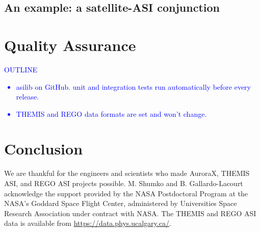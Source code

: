 \documentclass[draft]{agujournal2019}
\begin{document}
\subsection{An example: a satellite-ASI conjunction}

\section{Quality Assurance}
\textcolor{blue}{
      OUTLINE
      \begin{itemize}
            \item asilib on GitHub. unit and integration tests run automatically before every release.
            \item THEMIS and REGO data formats are set and won't change.
      \end{itemize}
}

\section{Conclusion}

\acknowledgments
We are thankful for the engineers and scientists who made AuroraX, THEMIS ASI, and REGO ASI projects possible. M. Shumko and B. Gallardo-Lacourt acknowledge the support provided by the NASA Postdoctoral Program at the NASA’s Goddard Space Flight Center, administered by Universities Space Research Association under contract with NASA. The THEMIS and REGO ASI data is available from \url{https://data.phys.ucalgary.ca/}.

% 
\end{document}
